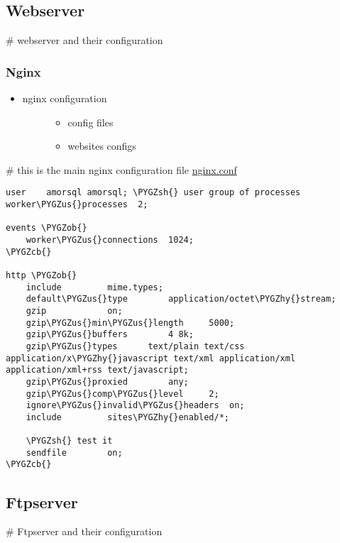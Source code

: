 \documentclass[letterpaper,10pt,english]{sphinxmanual}
\def\PYGZus{\char`\_}
\def\PYGZob{\char`\{}
\def\PYGZcb{\char`\}}
\def\PYGZsh{\char`\#}
\def\PYGZhy{\char`\-}
\begin{document}
\subsection{Webserver}
\label{sdocs/webserver/webserver:webserver}\label{sdocs/webserver/webserver::doc}
\# webserver and their configuration


\subsubsection{Nginx}
\label{sdocs/webserver/nginx/nginx:nginx}\label{sdocs/webserver/nginx/nginx::doc}\begin{itemize}
\item {} \begin{description}
\item[{nginx configuration}] \leavevmode\begin{itemize}
\item {} 
config files

\item {} 
websites configs

\end{itemize}

\end{description}

\end{itemize}

\# this is the main nginx configuration file {\hyperref[sdocs/webserver/nginx/nginx:nginx-conf]{nginx.conf}}
\label{sdocs/webserver/nginx/nginx:nginx-conf}
\begin{Verbatim}[commandchars=\\\{\}]
user	amorsql amorsql; \PYGZsh{} user group of processes
worker\PYGZus{}processes  2;

events \PYGZob{}
	worker\PYGZus{}connections  1024;
\PYGZcb{}

http \PYGZob{}
	include			mime.types;
	default\PYGZus{}type		application/octet\PYGZhy{}stream;
	gzip			on;
	gzip\PYGZus{}min\PYGZus{}length		5000;
	gzip\PYGZus{}buffers		4 8k;
	gzip\PYGZus{}types		text/plain text/css application/x\PYGZhy{}javascript text/xml application/xml application/xml+rss text/javascript;
	gzip\PYGZus{}proxied		any;
	gzip\PYGZus{}comp\PYGZus{}level		2;
	ignore\PYGZus{}invalid\PYGZus{}headers	on;
	include			sites\PYGZhy{}enabled/*;
	
	\PYGZsh{} test it
	sendfile		on;
\PYGZcb{}
\end{Verbatim}


\subsection{Ftpserver}
\label{sdocs/ftpserver/ftpserver:ftpserver}\label{sdocs/ftpserver/ftpserver::doc}
\# Ftpserver and their configuration
\end{document}

